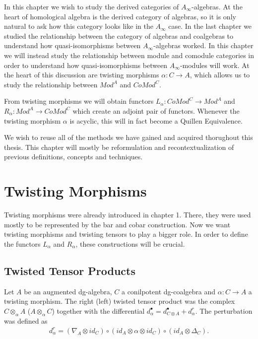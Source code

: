 \documentclass[../thesis.tex]{subfiles}
\begin{document}
    In this chapter we wish to study the derived categories of $A_\infty$-algebras. At the heart of homological algebra is the derived category of algebras, so it is only natural to ask how this category looks like in the $A_\infty$ case. In the last chapter we studied the relationship between the category of algebras and coalgebras to understand how quasi-isomorphisms between $A_\infty$-algebras worked. In this chapter we will instead study the relationship between module and comodule categories in order to understand how quasi-isomorphisms between $A_\infty$-modules will work. At the heart of this discussion are twisting morphisms $\alpha : C \rightarrow A$, which allows us to study the relationship between $Mod^A$ and $CoMod^C$.

    From twisting morphisms we will obtain functors $L_\alpha : CoMod^C \rightarrow Mod^A$ and $R_\alpha : Mod^A \rightarrow CoMod^C$ which create an adjoint pair of functors. Whenever the twisting morphism $\alpha$ is acyclic, this will in fact become a Quillen Equivalence.

    We wish to reuse all of the methods we have gained and acquired thorughout this thesis. This chapter will mostly be reformulation and recontextualization of previous definitions, concepts and techniques. 

    \section{Twisting Morphisms}

        Twisting morphisms were already introduced in chapter 1. There, they were used mostly to be represented by the bar and cobar construction. Now we want twisting morphisms and twisting tensors to play a bigger role. In order to define the functors $L_\alpha$ and $R_\alpha$, these constructions will be crucial.  

        \subsection{Twisted Tensor Products}

            Let $A$ be an augmented dg-algebra, $C$ a conilpotent dg-coalgebra and $\alpha : C \rightarrow A$ a twisting morphism. The right (left) twisted tensor product was the complex $C \otimes_\alpha A$ ($A\otimes_\alpha C$) together with the differential $d_\alpha^\bullet = d_{C\otimes A}^\bullet + d_\alpha^r$. The perturbation was defined as
            \begin{align*}
                d_\alpha^r = (\nabla_A\otimes id_C) \circ (id_A \otimes \alpha \otimes id_C) \circ (id_A \otimes \Delta_C).
            \end{align*}
\end{document}
